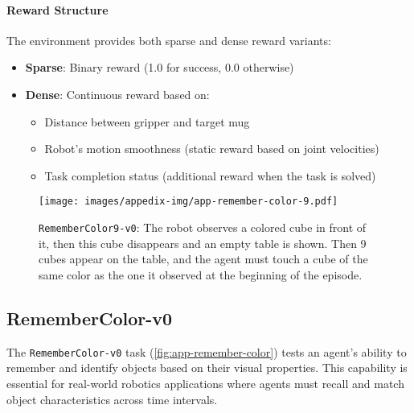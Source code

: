 \paragraph{Reward Structure} The environment provides both sparse and dense reward variants:
\begin{itemize}
    \item \textbf{Sparse}: Binary reward (1.0 for success, 0.0 otherwise)
    \item \textbf{Dense}: Continuous reward based on:
    \begin{itemize}
        \item Distance between gripper and target mug
        \item Robot's motion smoothness (static reward based on joint velocities)
        \item Task completion status (additional reward when the task is solved)
    \end{itemize}
\end{itemize}


\newpage
\begin{figure*}[h!]
    \centering
    \texttt{[image: images/appedix-img/app-remember-color-9.pdf]}
    \vspace{-15pt}
    \caption{\texttt{RememberColor9-v0}: The robot observes a colored cube in front of it, then this cube disappears and an empty table is shown. Then 9 cubes appear on the table, and the agent must touch a cube of the same color as the one it observed at the beginning of the episode.}
    \label{fig:app-remember-color}
    \vspace{-15pt}
\end{figure*}
\subsection{RememberColor-v0}
\label{app:remember-color}

The \texttt{RememberColor-v0} task (\autoref{fig:app-remember-color}) tests an agent's ability to remember and identify objects based on their visual properties. This capability is essential for real-world robotics applications where agents must recall and match object characteristics across time intervals.

